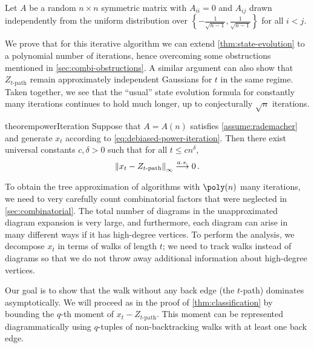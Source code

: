 \documentclass[12pt]{article}
\begin{document}
\begin{assumption}\label{assume:rademacher}
    Let $A$ be a random $n\times n$ symmetric matrix with $A_{ii}=0$ and $A_{ij}$ drawn independently from the uniform distribution over $\left\{-\frac{1}{\sqrt {n-1}}, \frac 1 {\sqrt {n-1}}\right\}$ for all $i<j$.
\end{assumption}


We prove that for this iterative algorithm we can extend \cref{thm:state-evolution} to a polynomial number of iterations, hence overcoming some obstructions mentioned in \cref{sec:combi-obstructions}.
A similar argument can also show that $Z_{t\text{-path}}$ remain
approximately independent Gaussians for $t$ in the same regime.
Taken together, we see that the ``usual'' state evolution formula for constantly many iterations continues to hold much longer,
up to conjecturally $\sqrt{n}$ iterations.


\begin{restatable}{theorem}{powerIteration}\label{thm:power-iteration}
    Suppose that $A=A(n)$ satisfies \cref{assume:rademacher} and generate $x_t$ according to \cref{eq:debiased-power-iteration}. Then there exist universal constants $c,\delta>0$ such that for all $t\le c n^{\delta}$,
    \[
        \left\|x_t-Z_{t\textnormal{-path}}\right\|_\infty\overset{a.s.}{\longrightarrow} 0\,.
    \]
\end{restatable}




To obtain the tree approximation of algorithms with $\poly(n)$ many iterations, we need to very carefully count combinatorial factors that were neglected in \cref{sec:combinatorial}.
The total number of diagrams in the unapproximated diagram expansion is very large, and furthermore, each diagram can arise in many different ways if it has high-degree vertices.
To perform the analysis, we decompose $x_t$ in terms
of walks of length $t$; we need to track walks instead of diagrams so that we do not throw away additional information about high-degree vertices.

Our goal is to show that the walk without any back edge (the $t$-path) dominates asymptotically. We will proceed as in the proof of \cref{thm:classification} by bounding the $q$-th moment of $x_t-Z_{\text{$t$-path}}$. This moment can be represented diagrammatically using $q$-tuples of non-backtracking walks with at least one back edge.
\end{document}
